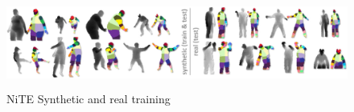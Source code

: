 \begin{figure}
	[h] \centering 
	\includegraphics[height=3cm]{figures/content/ni-train.jpg} \caption{NiTE Synthetic and real training} \label{fg:ni:train} 
\end{figure}
